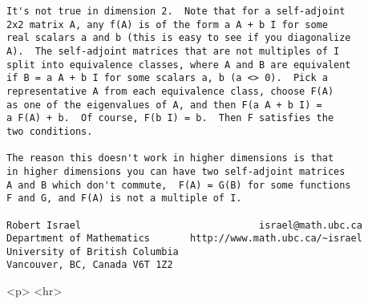 \begin{verbatim}
It's not true in dimension 2.  Note that for a self-adjoint 
2x2 matrix A, any f(A) is of the form a A + b I for some 
real scalars a and b (this is easy to see if you diagonalize 
A).  The self-adjoint matrices that are not multiples of I 
split into equivalence classes, where A and B are equivalent 
if B = a A + b I for some scalars a, b (a <> 0).  Pick a 
representative A from each equivalence class, choose F(A) 
as one of the eigenvalues of A, and then F(a A + b I) = 
a F(A) + b.  Of course, F(b I) = b.  Then F satisfies the 
two conditions.

The reason this doesn't work in higher dimensions is that 
in higher dimensions you can have two self-adjoint matrices 
A and B which don't commute,  F(A) = G(B) for some functions 
F and G, and F(A) is not a multiple of I.

Robert Israel                               israel@math.ubc.ca
Department of Mathematics       http://www.math.ubc.ca/~israel 
University of British Columbia            
Vancouver, BC, Canada V6T 1Z2

\end{verbatim}
    


<p> <hr>



